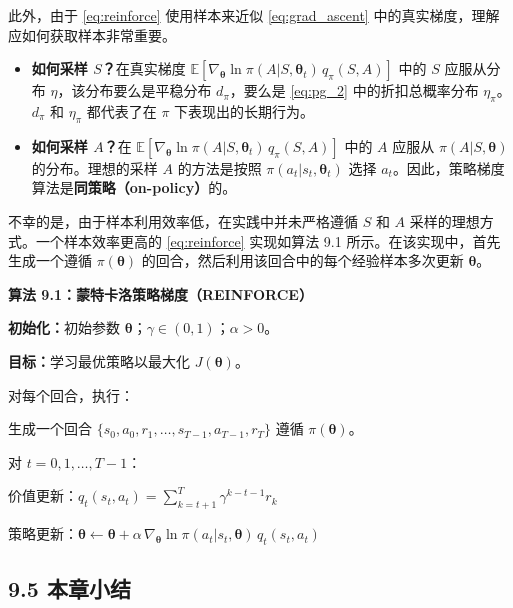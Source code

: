 \documentclass[UTF8]{article}
\begin{document}
此外，由于 \eqref{eq:reinforce} 使用样本来近似 \eqref{eq:grad_ascent} 中的真实梯度，理解应如何获取样本非常重要。

\begin{itemize}
    \item \textbf{如何采样 $S$？}在真实梯度 $\mathbb{E}[\nabla_{\boldsymbol{\theta}} \ln \pi(A|S, \boldsymbol{\theta}_t) \, q_\pi(S, A)]$ 中的 $S$ 应服从分布 $\eta$，该分布要么是平稳分布 $d_\pi$，要么是 \eqref{eq:pg_2} 中的折扣总概率分布 $\eta_\pi$。$d_\pi$ 和 $\eta_\pi$ 都代表了在 $\pi$ 下表现出的长期行为。
    \item \textbf{如何采样 $A$？}在 $\mathbb{E}[\nabla_{\boldsymbol{\theta}} \ln \pi(A|S, \boldsymbol{\theta}_t) \, q_\pi(S, A)]$ 中的 $A$ 应服从 $\pi(A|S, \boldsymbol{\theta})$ 的分布。理想的采样 $A$ 的方法是按照 $\pi(a_t|s_t, \boldsymbol{\theta}_t)$ 选择 $a_t$。因此，策略梯度算法是\textbf{同策略（on-policy）}的。
\end{itemize}

不幸的是，由于样本利用效率低，在实践中并未严格遵循 $S$ 和 $A$ 采样的理想方式。一个样本效率更高的 \eqref{eq:reinforce} 实现如算法 9.1 所示。在该实现中，首先生成一个遵循 $\pi(\boldsymbol{\theta})$ 的回合，然后利用该回合中的每个经验样本多次更新 $\boldsymbol{\theta}$。

\begin{definitionbox}
\noindent\textbf{算法 9.1：蒙特卡洛策略梯度（REINFORCE）}

\noindent\textbf{初始化：}初始参数 $\boldsymbol{\theta}$；$\gamma \in (0,1)$；$\alpha > 0$。

\noindent\textbf{目标：}学习最优策略以最大化 $J(\boldsymbol{\theta})$。

对每个回合，执行：

生成一个回合 $\{s_0, a_0, r_1, \dots, s_{T-1}, a_{T-1}, r_T\}$ 遵循 $\pi(\boldsymbol{\theta})$。

对 $t = 0, 1, \dots, T-1$：

\noindent\quad 价值更新：$q_t(s_t, a_t) = \sum_{k=t+1}^{T} \gamma^{k-t-1} r_k$

\noindent\quad 策略更新：$\boldsymbol{\theta} \gets \boldsymbol{\theta} + \alpha \, \nabla_{\boldsymbol{\theta}} \ln \pi(a_t|s_t, \boldsymbol{\theta}) \, q_t(s_t, a_t)$
\end{definitionbox}

\subsection*{9.5 本章小结}
\end{document}
